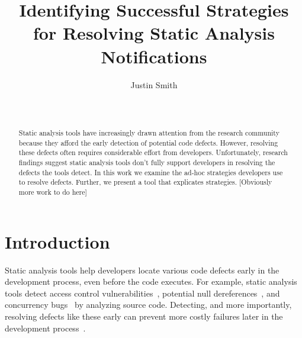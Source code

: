 \documentclass{sig-alternate}
\begin{document}
\toappear{}
\title{Identifying Successful Strategies for Resolving Static Analysis Notifications}

\author{
\alignauthor Justin Smith\\
\\
 \\
}

\maketitle


\begin{abstract}
Static analysis tools have increasingly drawn attention from the research community because they afford the early detection of potential code defects.
However, resolving these defects often requires considerable effort from developers.
Unfortunately, research findings suggest static analysis tools don't fully support developers in resolving the defects the tools detect.
In this work we examine the ad-hoc strategies developers use to resolve defects. 
Further, we present a tool that explicates strategies.
[Obviously more work to do here]

\end{abstract}


\section{Introduction}
\label{sec:intro}
Static analysis tools help developers locate various code defects early in the development process, even before the code executes. 
For example, static analysis tools detect access control vulnerabilities~\cite{Aside}, potential null dereferences~\cite{FindBugs}, and concurrency bugs~\cite{ThreadSafe} by analyzing source code.
Detecting, and more importantly, resolving defects like these early can prevent more costly failures later in the development process~\cite{ayewah2008using}.
\end{document}
